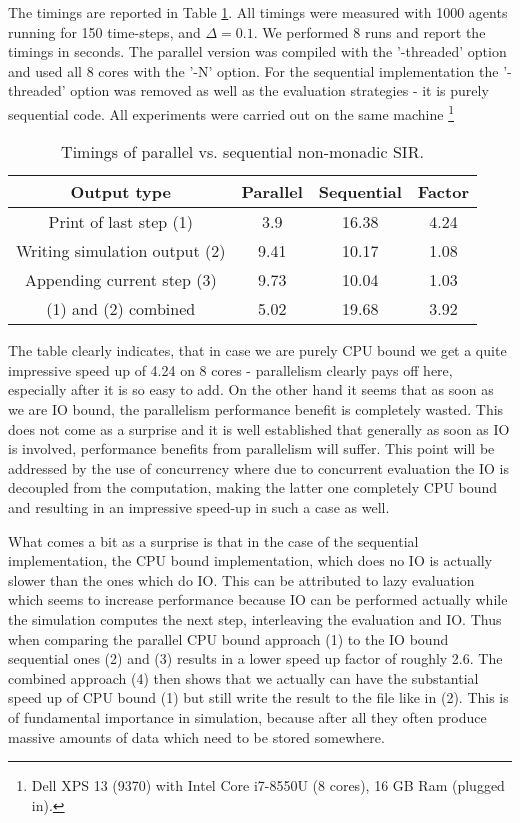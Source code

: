 The timings are reported in Table \ref{tab:parallel_nonmonadic_sir_timings}. All timings were measured with 1000 agents running for 150 time-steps, and $\Delta = 0.1$. We performed 8 runs and report the timings in seconds. The parallel version was compiled with the '-threaded' option and used all 8 cores with the '-N' option. For the sequential implementation the '-threaded' option was removed as well as the evaluation strategies - it is purely sequential code. All experiments were carried out on the same machine \footnote{Dell XPS 13 (9370) with Intel Core i7-8550U (8 cores), 16 GB Ram (plugged in).}

\begin{table}
	\centering
	\begin{tabular}{ c || c | c | c }
		Output type                   & Parallel & Sequential & Factor \\ \hline
		Print of last step (1)        & 3.9      & 16.38      & 4.24 \\ \hline
		Writing simulation output (2) & 9.41     & 10.17      & 1.08 \\ \hline
		Appending current step (3)    & 9.73     & 10.04      & 1.03 \\ \hline
		(1) and (2) combined	          & 5.02     & 19.68      & 3.92 \\ \hline
	\end{tabular}
	
	\caption{Timings of parallel vs. sequential non-monadic SIR.}
	\label{tab:parallel_nonmonadic_sir_timings}
\end{table}

The table clearly indicates, that in case we are purely CPU bound we get a quite impressive speed up of 4.24 on 8 cores - parallelism clearly pays off here, especially after it is so easy to add. On the other hand it seems that as soon as we are IO bound, the parallelism performance benefit is completely wasted. This does not come as a surprise and it is well established that generally as soon as IO is involved, performance benefits from parallelism will suffer. This point will be addressed by the use of concurrency where due to concurrent evaluation the IO is decoupled from the computation, making the latter one completely CPU bound and resulting in an impressive speed-up in such a case as well.

What comes a bit as a surprise is that in the case of the sequential implementation, the CPU bound implementation, which does no IO is actually slower than the ones which do IO. This can be attributed to lazy evaluation which seems to increase performance because IO can be performed actually while the simulation computes the next step, interleaving the evaluation and IO. Thus when comparing the parallel CPU bound approach (1) to the IO bound sequential ones (2) and (3) results in a lower speed up factor of roughly 2.6.
The combined approach (4) then shows that we actually can have the substantial speed up of CPU bound (1) but still write the result to the file like in (2). This is of fundamental importance in simulation, because after all they often produce massive amounts of data which need to be stored somewhere.

